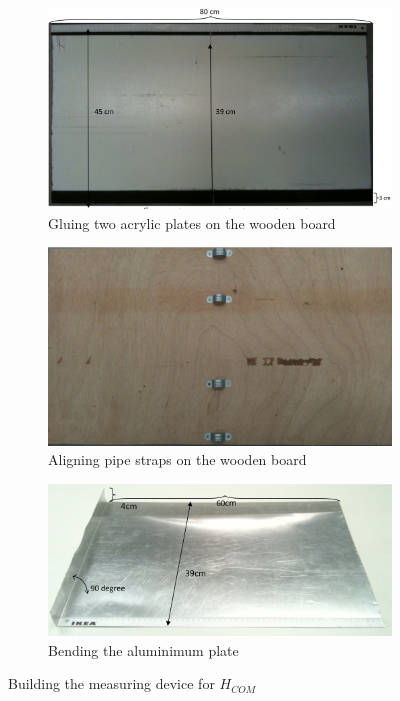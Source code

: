\begin{figure}[htb]
  \centering
  \begin{subfigure}{.45\textwidth}
    \includegraphics[width=\textwidth]{img/com-device-step1}
    \caption{Gluing two acrylic plates on the wooden board}
    \label{fig:gluing-acrylic-plates}
  \end{subfigure}
  \hfill
  \begin{subfigure}{.45\textwidth}
    \includegraphics[width=\textwidth]{img/com-device-step2}
    \caption{Aligning pipe straps on the wooden board}
    \label{fig:aligning-pipe-straps}
  \end{subfigure}
  \begin{subfigure}{.45\textwidth}
    \centering
    \includegraphics[width=\textwidth]{img/com-device-step3}
    \caption{Bending the aluminimum plate}
    \label{fig:bending-aluminium-plate}
  \end{subfigure}
  \caption{Building the measuring device for $H_{COM}$}
\end{figure}

